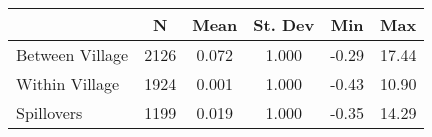 \begin{tabular}{l*{5}{c}}\hline&\multicolumn{1}{c}{N}&\multicolumn{1}{c}{Mean}&\multicolumn{1}{c}{St. Dev}&\multicolumn{1}{c}{Min}&\multicolumn{1}{c}{Max}\\ \hline 
Between Village & 2126 & 0.072 & 1.000 & -0.29 & 17.44 \\
Within Village & 1924 & 0.001 & 1.000 & -0.43 & 10.90 \\
Spillovers & 1199 & 0.019 & 1.000 & -0.35 & 14.29 \\
\hline \end{tabular}
